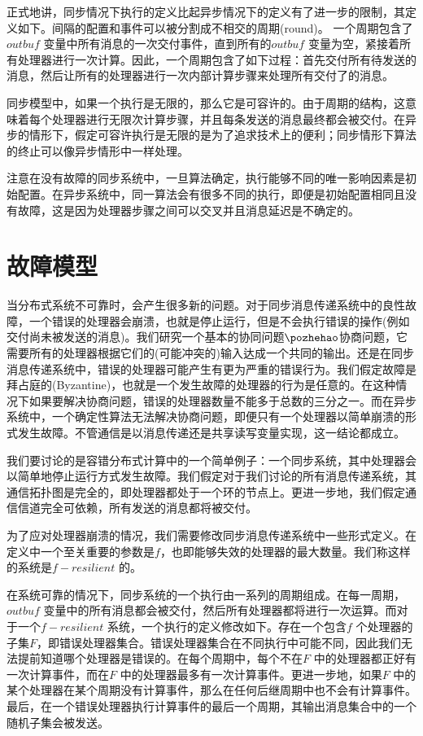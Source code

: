     正式地讲，同步情况下执行的定义比起异步情况下的定义有了进一步的限制，其定义如下。间隔的配置和事件可以被分割成不相交的周期(round)。 一个周期包含了$outbuf$ 变量中所有消息的一次交付事件，直到所有的$outbuf$ 变量为空，紧接着所有处理器进行一次计算。因此，一个周期包含了如下过程：首先交付所有待发送的消息，然后让所有的处理器进行一次内部计算步骤来处理所有交付了的消息。

    同步模型中，如果一个执行是无限的，那么它是可容许的。由于周期的结构，这意味着每个处理器进行无限次计算步骤，并且每条发送的消息最终都会被交付。在异步的情形下，假定可容许执行是无限的是为了追求技术上的便利；同步情形下算法的终止可以像异步情形中一样处理。

    注意在没有故障的同步系统中，一旦算法确定，执行能够不同的唯一影响因素是初始配置。在异步系统中，同一算法会有很多不同的执行，即便是初始配置相同且没有故障，这是因为处理器步骤之间可以交叉并且消息延迟是不确定的。

    \section{故障模型}
    当分布式系统不可靠时，会产生很多新的问题。对于同步消息传递系统中的良性故障，一个错误的处理器会崩溃，也就是停止运行，但是不会执行错误的操作(例如交付尚未被发送的消息)。我们研究一个基本的协同问题$\pozhehao$协商问题，它需要所有的处理器根据它们的(可能冲突的)输入达成一个共同的输出。还是在同步消息传递系统中，错误的处理器可能产生有更为严重的错误行为。我们假定故障是拜占庭的(Byzantine)，也就是一个发生故障的处理器的行为是任意的。在这种情况下如果要解决协商问题，错误的处理器数量不能多于总数的三分之一。而在异步系统中，一个确定性算法无法解决协商问题，即便只有一个处理器以简单崩溃的形式发生故障。不管通信是以消息传递还是共享读写变量实现，这一结论都成立。

    我们要讨论的是容错分布式计算中的一个简单例子：一个同步系统，其中处理器会以简单地停止运行方式发生故障。我们假定对于我们讨论的所有消息传递系统，其通信拓扑图是完全的，即处理器都处于一个环的节点上。更进一步地，我们假定通信信道完全可依赖，所有发送的消息都将被交付。

    为了应对处理器崩溃的情况，我们需要修改同步消息传递系统中一些形式定义。在定义中一个至关重要的参数是$f$，也即能够失效的处理器的最大数量。我们称这样的系统是$f-resilient$ 的。

    在系统可靠的情况下，同步系统的一个执行由一系列的周期组成。在每一周期，$outbuf$ 变量中的所有消息都会被交付，然后所有处理器都将进行一次运算。而对于一个$f-resilient$ 系统，一个执行的定义修改如下。存在一个包含$f$ 个处理器的子集$F$，即错误处理器集合。错误处理器集合在不同执行中可能不同，因此我们无法提前知道哪个处理器是错误的。在每个周期中，每个不在$F$ 中的处理器都正好有一次计算事件，而在$F$ 中的处理器最多有一次计算事件。更进一步地，如果$F$ 中的某个处理器在某个周期没有计算事件，那么在任何后继周期中也不会有计算事件。最后，在一个错误处理器执行计算事件的最后一个周期，其输出消息集合中的一个随机子集会被发送\cite{attiya2004distributed}。

